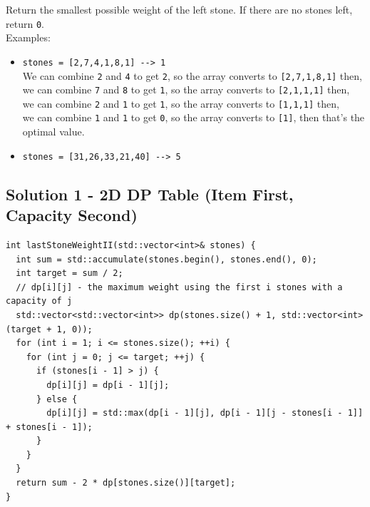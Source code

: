 Return the smallest possible weight of the left stone. If there are no stones left, return {\colorbox{CodeBackground}{\lstinline|0|}}.\\

Examples:
\begin{itemize}
\item {\colorbox{CodeBackground}{\lstinline|stones = [2,7,4,1,8,1] --> 1|}}\\
We can combine {\colorbox{CodeBackground}{\lstinline|2|}} and {\colorbox{CodeBackground}{\lstinline|4|}} to get {\colorbox{CodeBackground}{\lstinline|2|}}, so the array converts to {\colorbox{CodeBackground}{\lstinline|[2,7,1,8,1]|}} then,\\
we can combine {\colorbox{CodeBackground}{\lstinline|7|}} and {\colorbox{CodeBackground}{\lstinline|8|}} to get {\colorbox{CodeBackground}{\lstinline|1|}}, so the array converts to {\colorbox{CodeBackground}{\lstinline|[2,1,1,1]|}} then,\\
we can combine {\colorbox{CodeBackground}{\lstinline|2|}} and {\colorbox{CodeBackground}{\lstinline|1|}} to get {\colorbox{CodeBackground}{\lstinline|1|}}, so the array converts to {\colorbox{CodeBackground}{\lstinline|[1,1,1]|}} then,\\
we can combine {\colorbox{CodeBackground}{\lstinline|1|}} and {\colorbox{CodeBackground}{\lstinline|1|}} to get {\colorbox{CodeBackground}{\lstinline|0|}}, so the array converts to {\colorbox{CodeBackground}{\lstinline|[1]|}}, then that's the optimal value.
\item {\colorbox{CodeBackground}{\lstinline|stones = [31,26,33,21,40] --> 5|}}
\end{itemize}

\subsection*{Solution 1 - 2D DP Table (Item First, Capacity Second)}
\begin{lstlisting}
int lastStoneWeightII(std::vector<int>& stones) {
  int sum = std::accumulate(stones.begin(), stones.end(), 0);
  int target = sum / 2;
  // dp[i][j] - the maximum weight using the first i stones with a capacity of j
  std::vector<std::vector<int>> dp(stones.size() + 1, std::vector<int>(target + 1, 0));
  for (int i = 1; i <= stones.size(); ++i) {
    for (int j = 0; j <= target; ++j) {
      if (stones[i - 1] > j) {
        dp[i][j] = dp[i - 1][j];
      } else {
        dp[i][j] = std::max(dp[i - 1][j], dp[i - 1][j - stones[i - 1]] + stones[i - 1]);
      }
    }
  }
  return sum - 2 * dp[stones.size()][target];
}
\end{lstlisting}


